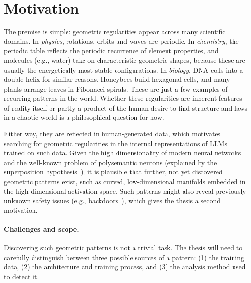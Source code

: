 \documentclass[11pt,a4paper]{article}
\begin{document}
\section{Motivation}
The premise is simple: geometric regularities appear across many scientific domains.
In \emph{physics}, rotations, orbits and waves are periodic.
In \emph{chemistry}, the periodic table reflects
the periodic recurrence of element properties, and molecules (e.g., water) take on characteristic geometric shapes, because these are usually the energetically most stable configurations. In \emph{biology}, DNA coils into a double
helix for similar reasons. Honeybees build hexagonal cells, and many plants arrange leaves in
Fibonacci spirals. These are just a few examples of recurring patterns in the
world.
Whether these regularities are inherent features of reality itself or partly a product of the human desire to find structure and laws in a chaotic world is a philosophical question for now.

Either way, they are reflected in human-generated data, which motivates searching for geometric regularities in the internal representations of LLMs trained on such data.
Given the high dimensionality of modern neural networks and the well-known problem of polysemantic neurons (explained by the superposition hypothesis~\cite{elhage2022toy}), it is plausible that further, not yet discovered geometric patterns exist, such as curved, low-dimensional manifolds embedded in the high-dimensional activation space.
Such patterns might also reveal previously unknown safety issues (e.g., backdoors~\cite{fay2026shape}), which gives the thesis a second motivation.

\paragraph{Challenges and scope.}
Discovering such geometric patterns is not a trivial task. The thesis will need to carefully distinguish between three possible sources of a pattern: (1) the training data, (2) the architecture and training process, and (3) the analysis method used to detect it.
\end{document}
